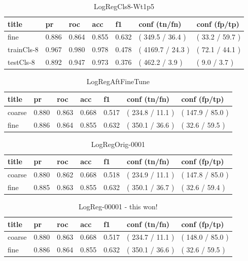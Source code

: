 \documentclass[ms]{nuthesis}
\begin{document}
\FloatBarrier
\begin{table}[H]
\centering
\begin{tabular}{|l||l||l||l||l||l||l|}\toprule
title & pr & roc & acc & f1 & conf (tn/fn) & conf (fp/tp) \\ \midrule
fine & 0.886 & 0.864 & 0.855 & 0.632 & ( 349.5 / 36.4 ) & ( 33.2 / 59.7 ) \\
trainCls-8 & 0.967 & 0.980 & 0.978 & 0.478 & ( 4169.7 / 24.3 ) & ( 72.1 / 44.1 ) \\
testCls-8 & 0.892 & 0.947 & 0.973 & 0.376 & ( 462.2 / 3.9 ) & ( 9.0 / 3.7 ) \\ \bottomrule
\end{tabular}
\caption{LogRegCls8-Wt1p5}
\label{tab:LogRegCls8-Wt1p5}
\end{table}
\FloatBarrier

\FloatBarrier
\begin{table}[H]
\centering
\begin{tabular}{|l||l||l||l||l||l||l|}\toprule
title & pr & roc & acc & f1 & conf (tn/fn) & conf (fp/tp) \\ \midrule
coarse & 0.880 & 0.863 & 0.668 & 0.517 & ( 234.8 / 11.1 ) & ( 147.9 / 85.0 ) \\
fine & 0.886 & 0.864 & 0.855 & 0.632 & ( 350.1 / 36.6 ) & ( 32.6 / 59.5 ) \\ \bottomrule
\end{tabular}
\caption{LogRegAftFineTune}
\label{tab:LogRegAftFineTune}
\end{table}
\FloatBarrier


\FloatBarrier
\begin{table}[H]
\centering
\begin{tabular}{|l||l||l||l||l||l||l|}\toprule
title & pr & roc & acc & f1 & conf (tn/fn) & conf (fp/tp) \\ \midrule
coarse & 0.880 & 0.862 & 0.668 & 0.518 & ( 234.9 / 11.1 ) & ( 147.8 / 85.0 ) \\
fine & 0.885 & 0.863 & 0.855 & 0.632 & ( 350.1 / 36.7 ) & ( 32.6 / 59.4 ) \\ \bottomrule
\end{tabular}
\caption{LogRegOrig-0001}
\label{tab:LogRegOrig-0001}
\end{table}
\FloatBarrier




\FloatBarrier
\begin{table}[h]
\centering
\begin{tabular}{|l||l||l||l||l||l||l|}\toprule
title & pr & roc & acc & f1 & conf (tn/fn) & conf (fp/tp) \\ \midrule
coarse & 0.880 & 0.863 & 0.668 & 0.517 & ( 234.7 / 11.1 ) & ( 148.0 / 85.0 ) \\
fine & 0.886 & 0.864 & 0.855 & 0.632 & ( 350.1 / 36.6 ) & ( 32.6 / 59.5 ) \\ \bottomrule
\end{tabular}
\caption{LogReg-00001 - this won!}
\label{tab:LogReg-00001Redo}
\end{table}
\FloatBarrier
\end{document}
